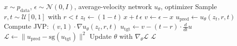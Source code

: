 \begin{algorithm}[htbp]
\caption{MeanFlow Training}
\label{alg:mean_flows}
\begin{algorithmic}[1]
\Require $x \sim p_{\text{data}}$, $\epsilon \sim \mathcal{N}(0,I)$, average-velocity network $u_\theta$, optimizer
\State Sample $r, t \sim \mathcal{U}[0,1]$ with $r < t$
\State $z_t \gets (1 - t) \, x + t \, \epsilon$ 
\State $v \gets \epsilon - x$ 
\State $u_{\text{pred}} \gets u_\theta(z_t, r, t)$
\State Compute JVP: $(v, 1) \cdot \nabla u_\theta(z_t, r, t)$ 
\State $u_{\text{tgt}} \gets v - (t - r) \cdot \frac{d}{dt} u$ 
\State $\mathcal{L} \gets \| u_{\text{pred}} - \text{sg}(u_{\text{tgt}}) \|^2$
\State Update $\theta$ with $\nabla_\theta \mathcal{L}$
\State \Return $\mathcal{L}$
\end{algorithmic}
\end{algorithm}
